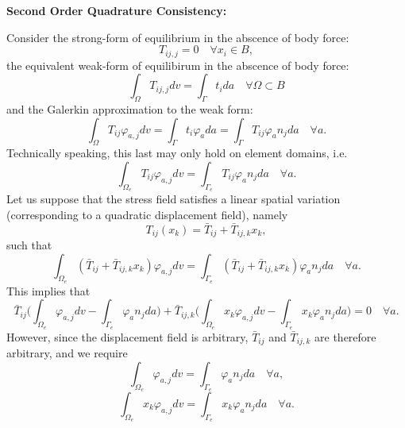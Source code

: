 \documentclass[11pt]{article} %
\begin{document}
\newpage

\begin{center}
\textbf{Second Order Quadrature Consistency:}
\end{center}

Consider the strong-form of equilibrium in the abscence of body force:
\begin{equation}
	T_{ij,j} = 0 \quad \forall x_i \in B,
\end{equation}
the equivalent weak-form of equilibirum in the abscence of body force:
\begin{equation}
	\int_{\Omega} T_{ij,j} dv = \int_{\Gamma} t_i da \quad \forall \Omega \subset B
\end{equation}
and the Galerkin approximation to the weak form:
\begin{equation}
	\int_{\Omega} T_{ij} \varphi_{a,j} dv = \int_{\Gamma} t_i \varphi_a da = \int_{\Gamma} T_{ij} \varphi_a n_j da \quad \forall a.
\end{equation}
Technically speaking, this last may only hold on element domains, i.e.
\begin{equation}
	\int_{\Omega_e} T_{ij} \varphi_{a,j} dv = \int_{\Gamma_e} T_{ij} \varphi_a n_j da \quad \forall a.
\end{equation}
Let us suppose that the stress field satisfies a linear spatial variation (corresponding to a quadratic displacement field), namely
\begin{equation}
	T_{ij} (x_k) = \bar{T}_{ij} + \bar{T}_{ij,k} x_k,
\end{equation}
such that
\begin{equation}
	\int_{\Omega_e} (\bar{T}_{ij} + \bar{T}_{ij,k} x_k) \varphi_{a,j} dv = \int_{\Gamma_e} (\bar{T}_{ij} + \bar{T}_{ij,k} x_k) \varphi_a n_j da \quad \forall a.
\end{equation}
This implies that
\begin{equation}
	\bar{T}_{ij} \bigg(\int_{\Omega_e} \varphi_{a,j} dv - \int_{\Gamma_e} \varphi_a n_j da \bigg) + \bar{T}_{ij,k} \bigg( \int_{\Omega_e} x_k \varphi_{a,j} dv - \int_{\Gamma_e} x_k \varphi_a n_j da \bigg) = 0  \quad \forall a.
\end{equation}
However, since the displacement field is arbitrary, $\bar{T}_{ij}$ and $\bar{T}_{ij,k}$ are therefore arbitrary, and we require
\begin{equation}
	\int_{\Omega_e} \varphi_{a,j} dv = \int_{\Gamma_e} \varphi_a n_j da \quad \forall a,
\end{equation}
\begin{equation}
	\int_{\Omega_e} x_k \varphi_{a,j} dv = \int_{\Gamma_e} x_k \varphi_a n_j da \quad \forall a.
\end{equation}
\end{document}

